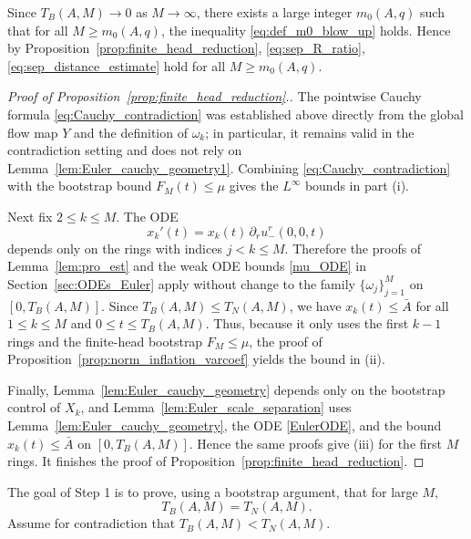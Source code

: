 \documentclass[reqno,11pt]{amsart}
\begin{document}
Since $T_B(A,M)\to0$ as $M\to\infty$, there exists a large integer $m_0(A,q)$
such that for all $M\ge m_0(A,q)$, the inequality \eqref{eq:def_m0_blow_up} holds.
Hence by Proposition~\ref{prop:finite_head_reduction}, \eqref{eq:sep_R_ratio}, \eqref{eq:sep_distance_estimate} hold for all $M\geq m_0(A,q)$.

\begin{proof}[Proof of Proposition~\ref{prop:finite_head_reduction}.]
The pointwise Cauchy formula \eqref{eq:Cauchy_contradiction} was established above directly from the
global flow map $Y$ and the definition of $\omega_k$; in particular, it remains valid in the
contradiction setting and does not rely on Lemma~\ref{lem:Euler_cauchy_geometry1}.
Combining \eqref{eq:Cauchy_contradiction} with the bootstrap bound $F_M(t)\le \mu$ gives the
$L^\infty$ bounds in part (i).


Next fix $2\le k\le M$.  The ODE
\[
x_k'(t)=x_k(t)\,\partial_r u_-^r(0,0,t)
\]
depends only on the rings with indices $j<k\le M$. Therefore the proofs of
Lemma~\ref{lem:pro_est} and the weak ODE bounds \eqref{mu_ODE} in
Section~\ref{sec:ODEs_Euler} apply without change to the family $\{\omega_j\}_{j=1}^M$ on
$[0,T_B(A,M)]$. Since $T_B(A,M)\leq T_N(A,M)$, we have $x_k(t)\le \bar A$ for all $1\le k\le M$
and $0\le t\le T_B(A,M)$. Thus, because it only uses the first $k-1$ rings and the finite-head bootstrap $F_M\leq \mu$, the proof of Proposition~\ref{prop:norm_inflation_varcoef}
yields the bound in (ii).

Finally, Lemma~\ref{lem:Euler_cauchy_geometry} depends only on the bootstrap control of
$X_k$, and Lemma~\ref{lem:Euler_scale_separation} uses
Lemma~\ref{lem:Euler_cauchy_geometry}, the ODE \eqref{EulerODE}, and the bound
$x_k(t)\le \bar A$ on $[0,T_B(A,M)]$. Hence the same proofs give (iii) for the first $M$ rings. It finishes the proof of Proposition~\ref{prop:finite_head_reduction}.
\end{proof}

The goal of Step 1 is to prove, using a bootstrap argument, that for large $M,$
\begin{equation}\label{eq:TB_ge_min_T0_TN}
T_B(A,M)=  T_N(A,M).
\end{equation}
Assume for contradiction that $T_B(A,M)< T_N(A,M).$
\end{document}
